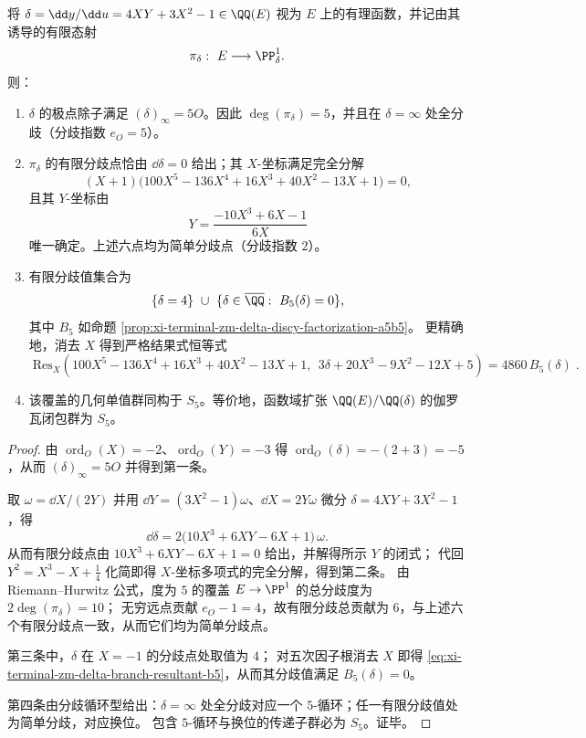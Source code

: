 \begin{theorem}\label{thm:xi-terminal-zm-delta-map-hurwitz-passport-s5}
将 \(\delta=\dd y/\dd u=4XY+3X^2-1\in\QQ(E)\) 视为 \(E\) 上的有理函数，并记由其诱导的有限态射
\[
\pi_\delta:\ E\longrightarrow \PP^1_\delta .
\]
则：
\begin{enumerate}
  \item \(\delta\) 的极点除子满足 \((\delta)_\infty=5O\)。因此 \(\deg(\pi_\delta)=5\)，并且在 \(\delta=\infty\) 处全分歧（分歧指数 \(e_O=5\)）。
  \item \(\pi_\delta\) 的有限分歧点恰由 \(\dd \delta=0\) 给出；其 \(X\)-坐标满足完全分解
  \[
  (X+1)\bigl(100X^5-136X^4+16X^3+40X^2-13X+1\bigr)=0,
  \]
  且其 \(Y\)-坐标由
  \[
  Y=\frac{-10X^3+6X-1}{6X}
  \]
  唯一确定。上述六点均为简单分歧点（分歧指数 \(2\)）。
  \item 有限分歧值集合为
  \[
  \{\delta=4\}\ \cup\ \{\delta\in\overline{\QQ}:\ B_5(\delta)=0\},
  \]
  其中 \(B_5\) 如命题 \ref{prop:xi-terminal-zm-delta-discy-factorization-a5b5}。
  更精确地，消去 \(X\) 得到严格结果式恒等式
  \begin{equation}\label{eq:xi-terminal-zm-delta-branch-resultant-b5}
  \boxed{\;
  \mathrm{Res}_X\!\left(
  100X^5-136X^4+16X^3+40X^2-13X+1,\ \ 3\delta+20X^3-9X^2-12X+5
  \right)=4860\,B_5(\delta)\; }.
  \end{equation}
  \item 该覆盖的几何单值群同构于 \(S_5\)。等价地，函数域扩张 \(\QQ(E)/\QQ(\delta)\) 的伽罗瓦闭包群为 \(S_5\)。
\end{enumerate}
\end{theorem}
\begin{proof}
由 \(\operatorname{ord}_O(X)=-2\)、\(\operatorname{ord}_O(Y)=-3\) 得
\(
\operatorname{ord}_O(\delta)=-(2+3)=-5
\)，从而 \((\delta)_\infty=5O\) 并得到第一条。
\par
取 \(\omega=\dd X/(2Y)\) 并用 \(\dd Y=(3X^2-1)\omega\)、\(\dd X=2Y\omega\) 微分 \(\delta=4XY+3X^2-1\)，得
\[
\dd\delta=2\bigl(10X^3+6XY-6X+1\bigr)\,\omega.
\]
从而有限分歧点由 \(10X^3+6XY-6X+1=0\) 给出，并解得所示 \(Y\) 的闭式；
代回 \(Y^2=X^3-X+\tfrac14\) 化简即得 \(X\)-坐标多项式的完全分解，得到第二条。
由 Riemann--Hurwitz 公式，度为 \(5\) 的覆盖 \(E\to\PP^1\) 的总分歧度为 \(2\deg(\pi_\delta)=10\)；
无穷远点贡献 \(e_O-1=4\)，故有限分歧总贡献为 \(6\)，与上述六个有限分歧点一致，从而它们均为简单分歧点。
\par
第三条中，\(\delta\) 在 \(X=-1\) 的分歧点处取值为 \(4\)；
对五次因子根消去 \(X\) 即得 \eqref{eq:xi-terminal-zm-delta-branch-resultant-b5}，从而其分歧值满足 \(B_5(\delta)=0\)。
\par
第四条由分歧循环型给出：\(\delta=\infty\) 处全分歧对应一个 \(5\)-循环；任一有限分歧值处为简单分歧，对应换位。
包含 \(5\)-循环与换位的传递子群必为 \(S_5\)。证毕。
\end{proof}

